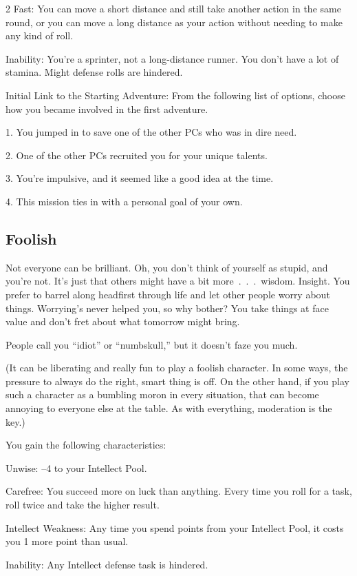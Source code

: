 \begin{multicols}{2}
Fast: You can move a short distance and still take another action in the same round, or you can move a long distance as your action without needing to make any kind of roll.

Inability: You’re a sprinter, not a long-distance runner. You don’t have a lot of stamina. Might defense rolls are hindered.

Initial Link to the Starting Adventure: From the following list of options, choose how you became involved in the first adventure.

1. You jumped in to save one of the other PCs who was in dire need.

2. One of the other PCs recruited you for your unique talents.

3. You’re impulsive, and it seemed like a good idea at the time.

4. This mission ties in with a personal goal of your own.

\subsection{Foolish}

Not everyone can be brilliant. Oh, you don’t think of yourself as stupid, and you’re not. It’s just that others might have a bit more . . . wisdom. Insight. You prefer to barrel along headfirst through life and let other people worry about things. Worrying’s never helped you, so why bother? You take things at face value and don’t fret about what tomorrow might bring.

People call you “idiot” or “numbskull,” but it doesn’t faze you much.

(It can be liberating and really fun to play a foolish character. In some ways, the pressure to always do the right, smart thing is off. On the other hand, if you play such a character as a bumbling moron in every situation, that can become annoying to everyone else at the table. As with everything, moderation is the key.)

You gain the following characteristics:

Unwise: –4 to your Intellect Pool.

Carefree: You succeed more on luck than anything. Every time you roll for a task, roll twice and take the higher result.

Intellect Weakness: Any time you spend points from your Intellect Pool, it costs you 1 more point than usual.

Inability: Any Intellect defense task is hindered.


\end{multicols}
